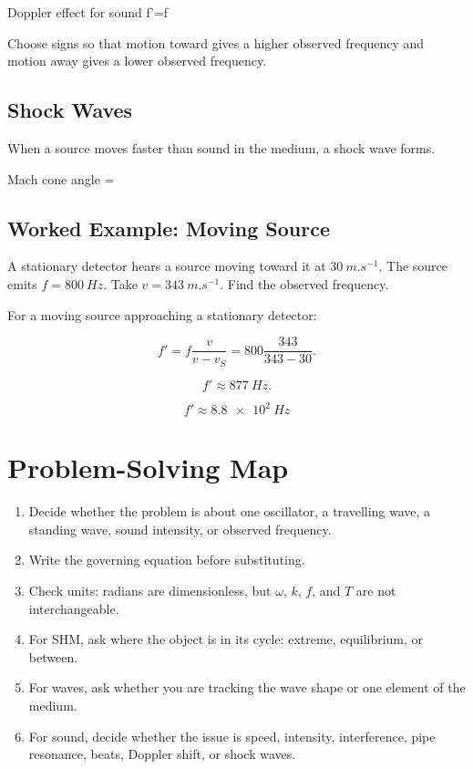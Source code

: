 \documentclass{studentnotes}
\begin{document}
\begin{namedformula}{Doppler effect for sound}
    f'=f
\end{namedformula}

Choose signs so that motion toward gives a higher observed frequency and motion
away gives a lower observed frequency.

\subsection{Shock Waves}

When a source moves faster than sound in the medium, a shock wave forms.

\begin{namedformula}{Mach cone angle}
    \sin\theta=
\end{namedformula}

\subsection{Worked Example: Moving Source}

A stationary detector hears a source moving toward it at
\(\SI{30}{m.s^{-1}}\). The source emits \(f=\SI{800}{Hz}\). Take
\(v=\SI{343}{m.s^{-1}}\). Find the observed frequency.

For a moving source approaching a stationary detector:

\[
    f'=f\frac{v}{v-v_S}
       =
       800\frac{343}{343-30}.
\]

\[
    f'\approx\SI{877}{Hz}.
\]

\[
    \boxed{f'\approx\SI{8.8e2}{Hz}}
\]

\section{Problem-Solving Map}

\begin{enumerate}
    \item Decide whether the problem is about one oscillator, a travelling wave,
    a standing wave, sound intensity, or observed frequency.
    \item Write the governing equation before substituting.
    \item Check units: radians are dimensionless, but \(\omega\), \(k\), \(f\),
    and \(T\) are not interchangeable.
    \item For SHM, ask where the object is in its cycle: extreme, equilibrium,
    or between.
    \item For waves, ask whether you are tracking the wave shape or one element
    of the medium.
    \item For sound, decide whether the issue is speed, intensity, interference,
    pipe resonance, beats, Doppler shift, or shock waves.
\end{enumerate}
\end{document}
